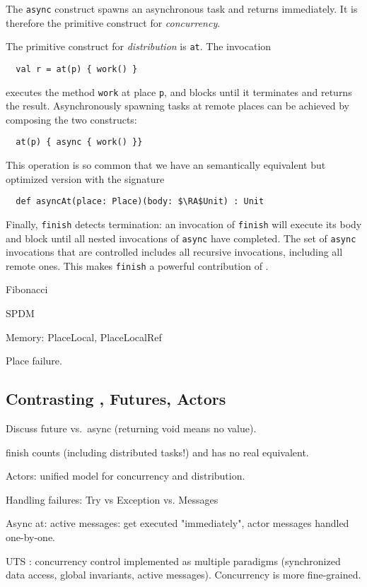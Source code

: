 The \lstinline{async} construct spawns an asynchronous task and returns
immediately. It is therefore the primitive construct for \emph{concurrency}.

The primitive construct for \emph{distribution} is \lstinline{at}. The invocation
\begin{lstlisting}
  val r = at(p) { work() }
\end{lstlisting}
executes the method \lstinline{work} at place \lstinline{p}, and blocks until
it terminates and returns the result. Asynchronously spawning tasks at remote places can be achieved by composing the two constructs:
\begin{lstlisting}
  at(p) { async { work() }}
\end{lstlisting}
This operation is so common that we have an semantically equivalent but optimized version with the signature
\begin{lstlisting}
  def asyncAt(place: Place)(body: $\RA$Unit) : Unit
\end{lstlisting}

Finally, \lstinline{finish} detects termination: an invocation of
\lstinline{finish} will execute its body and block until all nested invocations
of \lstinline{async} have completed. The set of \lstinline{async} invocations
that are controlled includes all recursive invocations, including all remote
ones. This makes \lstinline{finish} a powerful contribution of \apgas.

Fibonacci

SPDM

Memory: PlaceLocal, PlaceLocalRef

Place failure.

\subsection{Contrasting \apgas, Futures, Actors}

Discuss future vs.\ async (returning void means no value).

finish counts (including distributed tasks!) and has no real equivalent.

Actors: unified model for concurrency and distribution.

Handling failures: Try vs Exception vs. Messages

Async at: active messages: get executed "immediately", actor messages handled one-by-one.

UTS \apgas: concurrency control implemented as multiple paradigms (synchronized
data access, global invariants, active messages). Concurrency is more
fine-grained.


